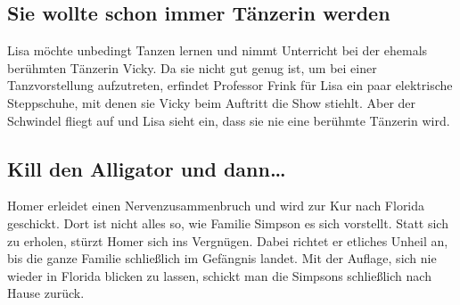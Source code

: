\subsection{Sie wollte schon immer Tänzerin werden}
Lisa möchte unbedingt Tanzen lernen und nimmt Unterricht bei der ehemals berühmten Tänzerin Vicky. Da sie nicht gut genug ist, um bei einer Tanzvorstellung aufzutreten, erfindet Professor Frink für Lisa ein paar elektrische Steppschuhe, mit denen sie Vicky beim Auftritt die Show stiehlt. Aber der Schwindel fliegt auf und Lisa sieht ein, dass sie nie eine berühmte Tänzerin wird.


	
\subsection{Kill den Alligator und dann\dots}
Homer erleidet einen Nervenzusammenbruch und wird zur Kur nach Florida geschickt. Dort ist nicht alles so, wie Familie Simpson es sich vorstellt. Statt sich zu erholen, stürzt Homer sich ins Vergnügen. Dabei richtet er etliches Unheil an, bis die ganze Familie schließlich im Gefängnis landet. Mit der Auflage, sich nie wieder in Florida blicken zu lassen, schickt man die Simpsons schließlich nach Hause zurück.

	
